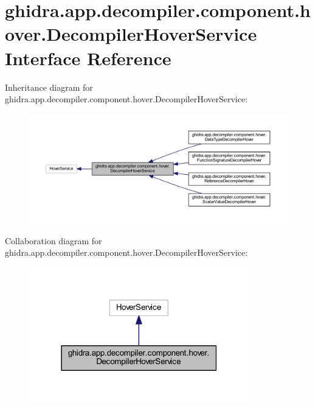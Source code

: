 \hypertarget{interfaceghidra_1_1app_1_1decompiler_1_1component_1_1hover_1_1_decompiler_hover_service}{}\section{ghidra.\+app.\+decompiler.\+component.\+hover.\+Decompiler\+Hover\+Service Interface Reference}
\label{interfaceghidra_1_1app_1_1decompiler_1_1component_1_1hover_1_1_decompiler_hover_service}


Inheritance diagram for ghidra.\+app.\+decompiler.\+component.\+hover.\+Decompiler\+Hover\+Service\+:
\nopagebreak
\begin{figure}[H]
\begin{center}
\leavevmode
\includegraphics[width=350pt]{interfaceghidra_1_1app_1_1decompiler_1_1component_1_1hover_1_1_decompiler_hover_service__inherit__graph}
\end{center}
\end{figure}


Collaboration diagram for ghidra.\+app.\+decompiler.\+component.\+hover.\+Decompiler\+Hover\+Service\+:
\nopagebreak
\begin{figure}[H]
\begin{center}
\leavevmode
\includegraphics[width=271pt]{interfaceghidra_1_1app_1_1decompiler_1_1component_1_1hover_1_1_decompiler_hover_service__coll__graph}
\end{center}
\end{figure}


